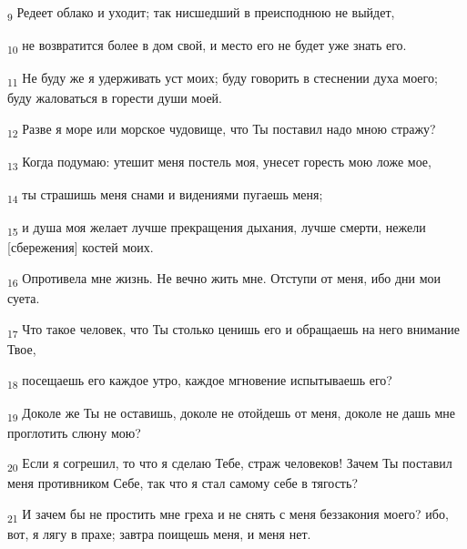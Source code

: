 \begin{tcolorbox}
\textsubscript{9} Редеет облако и уходит; так нисшедший в преисподнюю не выйдет,
\end{tcolorbox}
\begin{tcolorbox}
\textsubscript{10} не возвратится более в дом свой, и место его не будет уже знать его.
\end{tcolorbox}
\begin{tcolorbox}
\textsubscript{11} Не буду же я удерживать уст моих; буду говорить в стеснении духа моего; буду жаловаться в горести души моей.
\end{tcolorbox}
\begin{tcolorbox}
\textsubscript{12} Разве я море или морское чудовище, что Ты поставил надо мною стражу?
\end{tcolorbox}
\begin{tcolorbox}
\textsubscript{13} Когда подумаю: утешит меня постель моя, унесет горесть мою ложе мое,
\end{tcolorbox}
\begin{tcolorbox}
\textsubscript{14} ты страшишь меня снами и видениями пугаешь меня;
\end{tcolorbox}
\begin{tcolorbox}
\textsubscript{15} и душа моя желает лучше прекращения дыхания, лучше смерти, нежели [сбережения] костей моих.
\end{tcolorbox}
\begin{tcolorbox}
\textsubscript{16} Опротивела мне жизнь. Не вечно жить мне. Отступи от меня, ибо дни мои суета.
\end{tcolorbox}
\begin{tcolorbox}
\textsubscript{17} Что такое человек, что Ты столько ценишь его и обращаешь на него внимание Твое,
\end{tcolorbox}
\begin{tcolorbox}
\textsubscript{18} посещаешь его каждое утро, каждое мгновение испытываешь его?
\end{tcolorbox}
\begin{tcolorbox}
\textsubscript{19} Доколе же Ты не оставишь, доколе не отойдешь от меня, доколе не дашь мне проглотить слюну мою?
\end{tcolorbox}
\begin{tcolorbox}
\textsubscript{20} Если я согрешил, то что я сделаю Тебе, страж человеков! Зачем Ты поставил меня противником Себе, так что я стал самому себе в тягость?
\end{tcolorbox}
\begin{tcolorbox}
\textsubscript{21} И зачем бы не простить мне греха и не снять с меня беззакония моего? ибо, вот, я лягу в прахе; завтра поищешь меня, и меня нет.
\end{tcolorbox}
